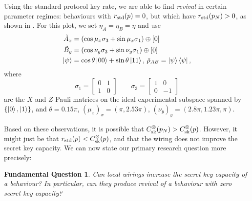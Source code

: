 \documentclass[10pt, a4paper]{article}
\numberwithin{equation}{section} %
\theoremstyle{definition}
\theoremstyle{plain}
\newtheorem{funqn}{Fundamental Question}
\newcommand{\?}{\mathrel{?}} %
\newcommand{\sk}{\rm sk}
\newcommand{\std}{\rm std}
\begin{document}
              Using the standard protocol key rate, we are able to find \emph{revival} in certain parameter regimes: behaviours with \(r_{\std}(p) = 0\), but which have \(r_{\std}(p_N) > 0\), as shown in . For this plot, we set \(\eta_A = \eta_B = \eta\) and use
              \begin{align*}
                \tilde{A}_x &= \left(\cos\mu_x \sigma_3 + \sin\mu_x \sigma_1\right) \oplus [0] \\
                \tilde{B}_y &= \left(\cos\nu_y \sigma_3 + \sin\nu_y \sigma_1\right) \oplus [0] \\
                \ket{\psi} &= \cos\theta \ket{00} + \sin\theta \ket{11},\,\tilde{\rho}_{AB} = \ket{\psi}\bra{\psi},
              \end{align*}
              where
              \[ \sigma_1 = \begin{bmatrix} 0 & 1 \\ 1 &  0 \end{bmatrix} \qquad \sigma_3 = \begin{bmatrix} 1 & 0 \\ 0 & -1 \end{bmatrix} \]
              are the \(X\) and \(Z\) Pauli matrices on the ideal experimental subspace spanned by \(\{\ket{0}, \ket{1}\}\), and \(\theta=0.15\pi\), \({(\mu_x)}_x = (\pi, 2.53\pi)\), \({(\nu_y)}_y = (2.8\pi, 1.23\pi, \pi)\).

              Based on these observations, it is possible that \(C^{\otimes}_{\sk}(p_N) > C^{\otimes}_{\sk}(p)\). However, it might just be that \(r_{\std}(p) < C^{\otimes}_{\sk}(p)\), and that the wiring does not improve the secret key capacity. We can now state our primary research question more precisely:
              \begin{funqn}\label{fqn:wircap}
                Can local wirings increase the secret key capacity of a behaviour? In particular, can they produce revival of a behaviour with zero secret key capacity?
              \end{funqn}
\end{document}

